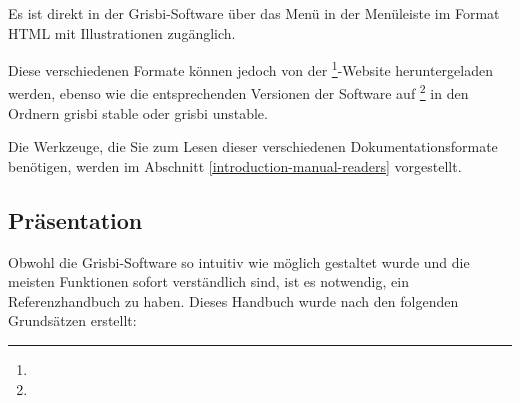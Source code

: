{%
Es ist direkt in der Grisbi-Software über das Menü  in der Menüleiste im Format \gls{HTML} mit Illustrationen zugänglich.

Diese verschiedenen Formate können jedoch von der \footnote{\urlSourceForgeDocumentation{}}-Website heruntergeladen werden, ebenso wie die entsprechenden Versionen der Software auf \footnote{\urlSourceForge{}} in den Ordnern \glqq{}\textsf{grisbi stable}\grqq{} oder \glqq{}\textsf{grisbi unstable}\grqq{}.

Die Werkzeuge, die Sie zum Lesen dieser verschiedenen Dokumentationsformate benötigen, werden im Abschnitt \vref{introduction-manual-readers}  vorgestellt.

\subsection{Präsentation\label{introduction-manual-presentation}}

Obwohl die Grisbi-Software so intuitiv wie möglich gestaltet wurde und die meisten Funktionen sofort verständlich sind, ist es notwendig, ein Referenzhandbuch zu haben. Dieses Handbuch wurde nach den folgenden Grundsätzen erstellt:

}
